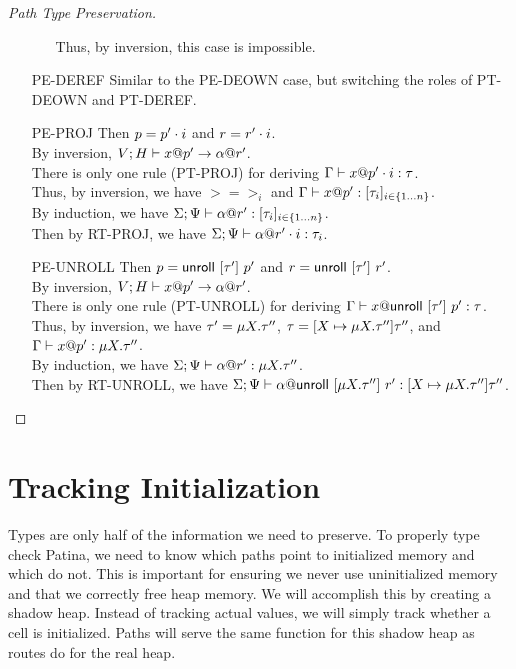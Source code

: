 \begin{proof}[Path Type Preservation]
\begin{itemize}
\begin{itemize}
	  Thus, by inversion, this case is impossible.
      \end{itemize}
    \item[PE-DEREF] 
      Similar to the \textsc{PE-DEOWN} case, but switching the roles of
      \textsc{PT-DEOWN} and \textsc{PT-DEREF}.
    \item[PE-PROJ] Then $p = {p'}\cdot{i}$ and $r = {r'}\cdot{i}$. \\
      By inversion, ${V;H} \vdash {{x}@{p'}} \to {{\alpha}@{r'}}$. \\
      There is only one rule (\textsc{PT-PROJ}) for deriving ${\Gamma} \vdash {{x}@{{p'}\cdot{i}}} : {\tau}$. \\
      Thus, by inversion, we have $\gt = \gt_i$ and ${\Gamma} \vdash {{x}@{p'}} : {[{{\tau}_{i}}]_{{i} \in \{1 \ldots {n}\} }}$. \\
      By induction, we have ${\Sigma;\Psi} \vdash {{\alpha}@{r'}} : {[{{\tau}_{i}}]_{{i} \in \{1 \ldots {n}\} }}$. \\
      Then by \textsc{RT-PROJ}, we have ${\Sigma;\Psi} \vdash {{\alpha}@{{r'}\cdot{i}}} : {\tau_i}$.
    \item[PE-UNROLL] Then $p = \mathsf{unroll}~[{\tau'}]~{p'}$ and $r = \mathsf{unroll}~[{\tau'}]~{r'}$. \\
      By inversion, ${V;H} \vdash {{x}@{p'}} \to {{\alpha}@{r'}}$. \\
      There is only one rule (\textsc{PT-UNROLL}) for deriving
      ${\Gamma} \vdash {{x}@{\mathsf{unroll}~[{\tau'}]~{p'}}} : {\tau}$. \\
      Thus, by inversion, we have $\tau' = \mu {X}.{\tau''}$,
      $\tau = [{X} \mapsto {\mu {X}.{\tau''}}] {\tau''}$, and
      ${\Gamma} \vdash {{x}@{p'}} : {\mu {X}.{\tau''}}$. \\
      By induction, we have ${\Sigma;\Psi} \vdash {{\alpha}@{r'}} : {\mu {X}.{\tau''}}$. \\
      Then by \textsc{RT-UNROLL}, we have
      ${\Sigma;\Psi} \vdash {{\alpha}@{\mathsf{unroll}~[{\mu {X}.{\tau''}}]~{r'}}} : {[{X} \mapsto {\mu {X}.{\tau''}}] {\tau''}}$.
  \end{itemize}
\end{proof}

\section*{Tracking Initialization}
Types are only half of the information we need to preserve.
To properly type check Patina, we need to know which paths point to initialized memory
and which do not. This is important for ensuring we never use uninitialized memory and
that we correctly free heap memory.
We will accomplish this by creating a shadow heap.
Instead of tracking actual values, we will simply track whether a cell is initialized.
Paths will serve the same function for this shadow heap as routes do for the real heap.

